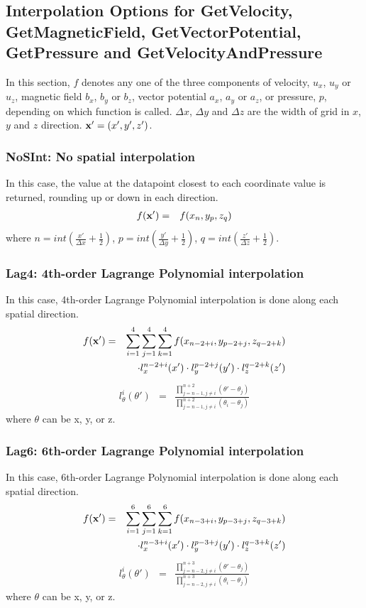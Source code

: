 \documentclass[11pt]{article}
\def\bea{\begin{eqnarray}}
\def\eea{\end{eqnarray}}
\begin{document}
\subsection{Interpolation Options for GetVelocity, GetMagneticField, GetVectorPotential, GetPressure and GetVelocityAndPressure}
In this section, $f$ denotes any one of the three components of
velocity, $u_x$, $u_y$ or $u_z$, magnetic field $b_x$, $b_y$ or $b_z$, vector potential $a_x$, $a_y$ or $a_z$, or pressure, $p$,  depending on which
function is called. $\Delta x$, $\Delta y$ and $\Delta z$ are the
width of grid in $x$, $y$ and $z$ direction. ${\bf x'}=(x',y',z')$.
\subsubsection*{NoSInt: No spatial  interpolation}
\label{sec-noint}
In this case, the value at the datapoint closest to each
coordinate value is returned, rounding up or down in each
direction. \bea f({\bf x'}) &=& f(x_n,y_p,z_q)\eea where
$n=int(\frac{x'}{\Delta x}+\frac{1}{2})$, $p=int(\frac{y'}{\Delta
y}+\frac{1}{2})$, $q=int(\frac{z'}{\Delta z}+\frac{1}{2})$.

\subsubsection*{Lag4: 4th-order Lagrange Polynomial interpolation}

In this case, 4th-order Lagrange Polynomial interpolation is done along each spatial direction.
\bea f({\bf x'}) &=&
\sum_{i=1}^4\sum_{j=1}^4\sum_{k=1}^4f(x_{n-2+i},y_{p-2+j},z_{q-2+k})\nonumber\\
&&\cdot l_x^{n-2+i}(x')\cdot l_y^{p-2+j}(y')\cdot
l_z^{q-2+k}(z')\eea \bea l_\theta^i(\theta') &=&
\frac{\prod\limits_{j=n-1,j\neq
i}^{n+2}(\theta'-\theta_j)}{\prod\limits_{j=n-1,j\neq
i}^{n+2}(\theta_i-\theta_j)}\eea where $\theta$ can be x, y, or z.

\subsubsection*{Lag6: 6th-order Lagrange Polynomial interpolation}

In this case, 6th-order Lagrange Polynomial interpolation is done along each spatial direction.
\bea f({\bf x'}) &=&
\sum_{i=1}^6\sum_{j=1}^6\sum_{k=1}^6f(x_{n-3+i},y_{p-3+j},z_{q-3+k})\nonumber\\
&&\cdot l_x^{n-3+i}(x')\cdot l_y^{p-3+j}(y')\cdot
l_z^{q-3+k}(z')\eea \bea l_\theta^i(\theta') &=&
\frac{\prod\limits_{j=n-2,j\neq
i}^{n+3}(\theta'-\theta_j)}{\prod\limits_{j=n-2,j\neq
i}^{n+3}(\theta_i-\theta_j)}\eea where $\theta$ can be x, y, or z.
\end{document}
